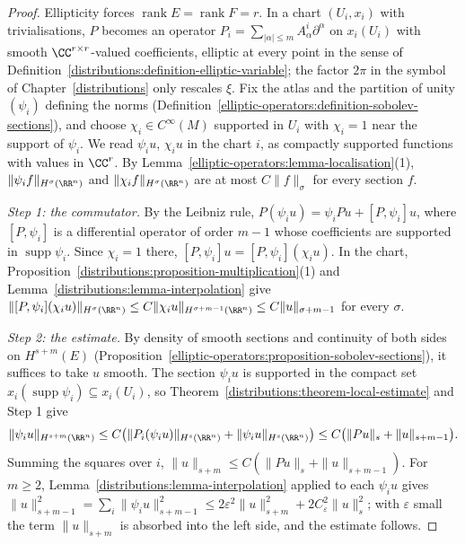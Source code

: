 \begin{proof}
Ellipticity forces $\operatorname{rank}E = \operatorname{rank}F = r$. In a chart $(U_i, x_i)$ with trivialisations, $P$ becomes an operator $P_i = \sum_{|\alpha| \leq m}A^i_\alpha\partial^\alpha$ on $x_i(U_i)$ with smooth
$\CC^{r \times r}$-valued coefficients, elliptic at every point in the sense of Definition~\ref{distributions:definition-elliptic-variable}; the factor $2\pi$ in the symbol of Chapter~\ref{distributions} only rescales $\xi$. Fix the
atlas and the partition of unity $(\psi_i)$ defining the norms (Definition~\ref{elliptic-operators:definition-sobolev-sections}), and choose $\chi_i \in C^\infty(M)$ supported in $U_i$ with $\chi_i = 1$ near the support of
$\psi_i$. We read $\psi_iu$, $\chi_iu$ in the chart $i$, as compactly supported functions with values in $\CC^r$. By Lemma~\ref{elliptic-operators:lemma-localisation}(1), $\|\psi_if\|_{H^\sigma(\RR^n)}$ and $\|\chi_if\|_{H^\sigma(\RR^n)}$ are
at most $C\|f\|_\sigma$ for every section $f$.

\emph{Step 1: the commutator.} By the Leibniz rule, $P(\psi_iu) = \psi_iPu + [P, \psi_i]u$, where $[P, \psi_i]$ is a differential operator of order $m - 1$ whose coefficients are supported in $\operatorname{supp}\psi_i$. Since
$\chi_i = 1$ there, $[P, \psi_i]u = [P, \psi_i](\chi_iu)$. In the chart, Proposition~\ref{distributions:proposition-multiplication}(1) and Lemma~\ref{distributions:lemma-interpolation} give
$\|[P, \psi_i](\chi_iu)\|_{H^\sigma(\RR^n)} \leq C\|\chi_iu\|_{H^{\sigma+m-1}(\RR^n)} \leq C\|u\|_{\sigma+m-1}$ for every $\sigma$.

\emph{Step 2: the estimate.} By density of smooth sections and continuity of both sides on $H^{s+m}(E)$ (Proposition~\ref{elliptic-operators:proposition-sobolev-sections}), it suffices to take $u$ smooth. The section $\psi_iu$ is supported in
the compact set $x_i(\operatorname{supp}\psi_i) \subseteq x_i(U_i)$, so Theorem~\ref{distributions:theorem-local-estimate} and Step 1 give
\[
\|\psi_iu\|_{H^{s+m}(\RR^n)} \leq C\bigl(\|P_i(\psi_iu)\|_{H^s(\RR^n)} + \|\psi_iu\|_{H^s(\RR^n)}\bigr) \leq C\bigl(\|Pu\|_s + \|u\|_{s+m-1}\bigr).
\]
Summing the squares over $i$, $\|u\|_{s+m} \leq C(\|Pu\|_s + \|u\|_{s+m-1})$. For $m \geq 2$, Lemma~\ref{distributions:lemma-interpolation} applied to each $\psi_iu$ gives
$\|u\|_{s+m-1}^2 = \sum_i\|\psi_iu\|_{s+m-1}^2 \leq 2\varepsilon^2\|u\|_{s+m}^2 + 2C_\varepsilon^2\|u\|_s^2$; with $\varepsilon$ small the term $\|u\|_{s+m}$ is absorbed into the left side, and the estimate follows.


\end{proof}
